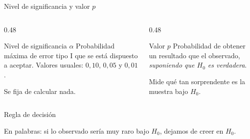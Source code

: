 \documentclass[aspectratio=169,10pt]{beamer}
\begin{document}
\begin{frame}{Nivel de significancia y valor $p$}
  \begin{columns}[T,onlytextwidth]
    \begin{column}{0.48\textwidth}
      \begin{block}{Nivel de significancia $\alpha$}
        \footnotesize
        Probabilidad máxima de error tipo I que se está dispuesto a aceptar.
        Valores usuales: $0{,}10$, $0{,}05$ y $0{,}01$.

        \vspace{0.1cm}
        Se fija  de calcular nada.
      \end{block}
    \end{column}
    \begin{column}{0.48\textwidth}
      \begin{exampleblock}{Valor $p$}
        \footnotesize
        Probabilidad de obtener un resultado  que el
        observado, \emph{suponiendo que $H_0$ es verdadera}.

        \vspace{0.1cm}
        Mide qué tan sorprendente es la muestra bajo $H_0$.
      \end{exampleblock}
    \end{column}
  \end{columns}

  \vspace{0.25cm}
  \begin{alertblock}{Regla de decisión}
    \footnotesize
    \centering

    \vspace{0.1cm}
    {\scriptsize En palabras: si lo observado sería muy raro bajo $H_0$,
    dejamos de creer en $H_0$.}
  \end{alertblock}
\end{frame}
\end{document}
